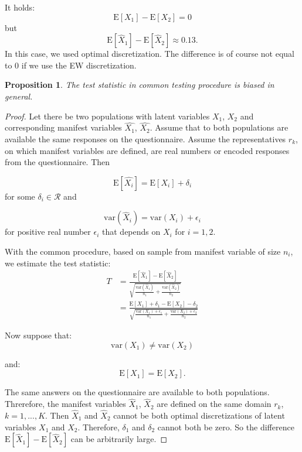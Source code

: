 \documentclass[10pt]{article}
\newtheorem{prop}{Proposition}
\begin{document}
It holds:
\begin{equation}
\mathrm{E}[X_{1}] - \mathrm{E}[X_{2}] = 0
\end{equation}
but
\begin{equation}
\mathrm{E}[\hat{X}_{1}] - \mathrm{E}[\hat{X}_{2}] \approx 0.13.
\end{equation}
In this case, we used optimal discretization. The difference is of course not equal to 0 if we use the EW discretization.

\begin{prop}
The test statistic in common testing procedure is biased in general.
\end{prop}
\begin{proof}
Let there be two populations with latent variables $X_{1}$, $X_{2}$ and corresponding manifest variables $\hat{X_{1}}$, $\hat{X_{2}}$. Assume that to both populations are available the same responses on the questionnaire. Assume the representatives $r_{k}$, on which manifest variables are defined, are real numbers or encoded responses from the questionnaire. Then 

\begin{equation}
\mathrm{E}[\hat{X_{i}}] = \mathrm{E}[X_{i}] + \delta_{i}
\end{equation}
for some $\delta_{i} \in \mathcal{R}$ and

\begin{equation}
\mathrm{var}(\hat{X}_{i}) = \mathrm{var}(X_{i}) + \epsilon_{i}
\end{equation}
for positive real number $\epsilon_{i}$ that depends on $X_{i}$ for $i = 1,2$.

With the common procedure, based on sample from manifest variable of size $n_{i}$, we estimate the test statistic:
\begin{align}
T &= \frac{
\mathrm{E}[\hat{X}_{1}] - \mathrm{E}[\hat{X}_{2}]
}{
\sqrt{
\frac{\mathrm{var}(\hat{X}_{1})}{n_{1}} + 
\frac{\mathrm{var}(\hat{X}_{2})}{n_{2}}
}
} \\
&= \frac{
\mathrm{E}[X_{1}] + \delta_{1} - \mathrm{E}[X_{2}] - \delta_{2}
}{
\sqrt{
\frac{\mathrm{var}(X_{1}) + \epsilon_{1} }{n_{1}} + 
\frac{\mathrm{var}(X_{2}) + \epsilon_{2} }{n_{2}}
}
}
\end{align}

Now suppose that:
\begin{equation}
\mathrm{var}(X_{1}) \neq \mathrm{var}(X_{2})
\end{equation}

and:
\begin{equation}
\mathrm{E}[X_{1}] = \mathrm{E}[X_{2}].
\end{equation}

The same answers on the questionnaire are available to both populations. Threrefore, the manifest variables $\hat{X}_{1}$, $\hat{X}_{2}$ are defined on the same domain $r_{k}$, $k = 1,...,K$. Then $\hat{X}_{1}$ and $\hat{X}_{2}$ cannot be both optimal discretizations of latent variables $X_{1}$ and $X_{2}$. Therefore, $\delta_{1}$ and $\delta_{2}$ cannot both be zero. So the difference $\mathrm{E}[\hat{X}_{1}] - \mathrm{E}[\hat{X}_{2}]$ can be arbitrarily large. 
\end{proof}
\end{document}
